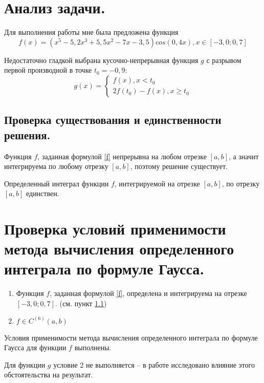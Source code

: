 \documentclass[a4paper, 12pt]{article}
\begin{document}
	\section{Анализ задачи.}
	
	Для выполнения работы мне была предложена функция
	\begin{equation} \label{f}
		f(x)=(x^5-5,2x^3+5,5x^2-7x-3,5)cos(0,4x), x\in[-3,0;0,7]
	\end{equation}
	
	Недостаточно гладкой выбрана кусочно-непрерывная функция $g$ с разрывом первой производной в точке $t_0 = -0,9$:
	\begin{equation}
		g(x)=
		\begin{cases}
			f(x), x < t_0\\
			2f(t_0)-f(x), x \geq t_0
		\end{cases}
	\end{equation} 
	
	\subsection{Проверка существования и единственности решения.}
	\label{solexistance}
	
	Функция $f$, заданная формулой \eqref{f} непрерывна на любом отрезке $[a,b]$, а значит интегрируема по любому отрезку $[a,b]$, поэтому решение существует.
	
	Определенный интеграл функции $f$, интегрируемой на отрезке $[a,b]$, по отрезку $[a,b]$ единствен.
	
	\section{Проверка условий применимости метода вычисления определенного интеграла по формуле Гаусса.}
	
	\begin{enumerate}
		\item Функция $f$, заданная формулой \eqref{f}, определена и интегрируема на отрезке $[-3,0;0,7]$. (см. пункт \ref{solexistance})
		\item $f\in C^{(6)}(a,b)$
	\end{enumerate}
	
	Условия применимости метода вычисления определенного интеграла по формуле Гаусса для функции $f$ выполнены.
	
	Для функции $g$ условие 2 не выполняется -- в работе исследовано влияние этого обстоятельства на результат.
	
\end{document}
